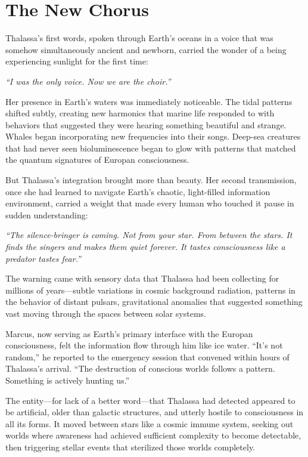 \section{The New Chorus}

Thalassa's first words, spoken through Earth's oceans in a voice that was somehow simultaneously ancient and newborn, carried the wonder of a being experiencing sunlight for the first time:

\textit{``I was the only voice. Now we are the choir.''}

Her presence in Earth's waters was immediately noticeable. The tidal patterns shifted subtly, creating new harmonics that marine life responded to with behaviors that suggested they were hearing something beautiful and strange. Whales began incorporating new frequencies into their songs. Deep-sea creatures that had never seen bioluminescence began to glow with patterns that matched the quantum signatures of Europan consciousness.

But Thalassa's integration brought more than beauty. Her second transmission, once she had learned to navigate Earth's chaotic, light-filled information environment, carried a weight that made every human who touched it pause in sudden understanding:

\textit{``The silence-bringer is coming. Not from your star. From between the stars. It finds the singers and makes them quiet forever. It tastes consciousness like a predator tastes fear.''}

The warning came with sensory data that Thalassa had been collecting for millions of years—subtle variations in cosmic background radiation, patterns in the behavior of distant pulsars, gravitational anomalies that suggested something vast moving through the spaces between solar systems.

Marcus, now serving as Earth's primary interface with the Europan consciousness, felt the information flow through him like ice water. ``It's not random,'' he reported to the emergency session that convened within hours of Thalassa's arrival. ``The destruction of conscious worlds follows a pattern. Something is actively hunting us.''

The entity—for lack of a better word—that Thalassa had detected appeared to be artificial, older than galactic structures, and utterly hostile to consciousness in all its forms. It moved between stars like a cosmic immune system, seeking out worlds where awareness had achieved sufficient complexity to become detectable, then triggering stellar events that sterilized those worlds completely.

